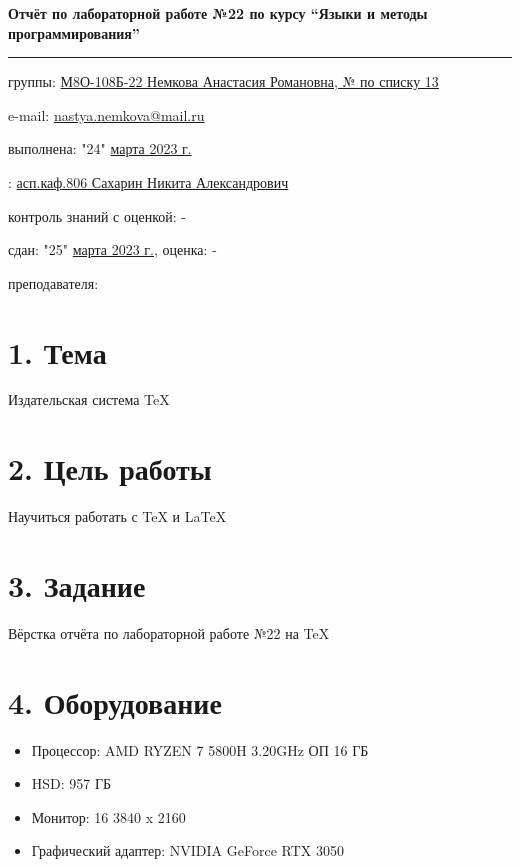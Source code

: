 \documentclass[11pt]{report}
\begin{document}
\begin{flushleft}

{%
\Large
\bf Отчёт по лабораторной работе №22 по курсу ``Языки и методы программирования'' \\
\rule{150mm}{.3pt}
}

\vspace{3mm}
{%
{ группы:}
 \underline{М8О-108Б-22 Немкова Анастасия Романовна, № по списку 13}
 
\vspace{3mm}
{ e-mail:}
\href{mailto:nastya.nemkova@mail.ru}{nastya.nemkova@mail.ru}

\vspace{3mm}
{ выполнена:}
"24" \underline{марта 2023 г.}

\vspace{3mm}
{:}
\underline{асп.каф.806 Сахарин Никита Александрович}

\vspace{3mm}
{ контроль знаний с оценкой:}
-

\vspace{3mm}
{ сдан:}
"25" \underline{марта 2023 г.,} { оценка:}
-

\vspace{3mm}
{ преподавателя:} \underline{\hspace{3cm}}
}
\end{flushleft}

\section*{1. Тема}
Издательская система TeX

\section*{2. Цель работы}
Научиться работать с TeX и LaTeX 

\section*{3. Задание}
Вёрстка отчёта по лабораторной работе №22 на TeX

\section*{4. Оборудование}
\begin{itemize}
    \item Процессор: AMD RYZEN 7 5800H 3.20GHz ОП 16 ГБ
    \item HSD: 957 ГБ
    \item Монитор: 16 3840 x 2160
    \item Графический адаптер:  NVIDIA GeForce RTX 3050
\end{itemize}
\end{document}
